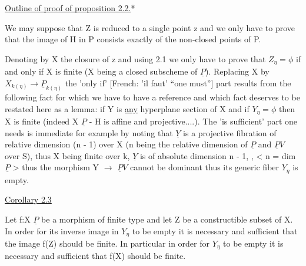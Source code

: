 
\uline{Outline of proof of proposition 2.2.}*

We may suppose that Z is reduced to a single point z and we
only have to prove that the image of H in P consists exactly of
the non-closed points of P.

Denoting by X the closure of z and using 2.1 we only have to
prove that $Z_{\eta} = \phi$ if and only if X is finite (X being a closed
subscheme of $\underline{P}$).  Replacing X by $X_{k(\eta)} \to \underline{P}_{k(\eta)}$ the 'only if'
[French:  'il faut' ``one must''] part results from the following
fact for which we have to have a reference and which fact deserves
to be restated here as a lemma:  if Y is \uline{any} hyperplane section of
X and if $Y_{\eta} = \phi$ then X is finite (indeed X \quad\quad $\underline{P}$ - H is affine and
projective....).  The 'is sufficient' part one needs is immediate
for example by noting that $\underline{Y}$ is a projective fibration of relative
dimension (n - 1) over X (n being the relative dimension of $\underline{P}$ and
$\underline{P}V$ over S), thus X being finite over k, $\underline{Y}$ is of absolute dimension
n - 1, , < n = dim $\underline{P}$ > thus the morphism Y $\to$ $\underline{P}V$ cannot be dominant
thus its generic fiber $Y_{\eta}$ is empty.

\uline{Corollary 2.3}

Let f:X \quad\quad\quad\quad $\underline{P}$ be a morphism of finite type and let Z be
a constructible subset of X.  In order for its inverse image in $Y_{\eta}$
to be empty it is necessary and sufficient that the image f(Z)
should be finite.  In particular in order for $Y_{\eta}$ to be empty it is
necessary and sufficient that f(X) should be finite.

